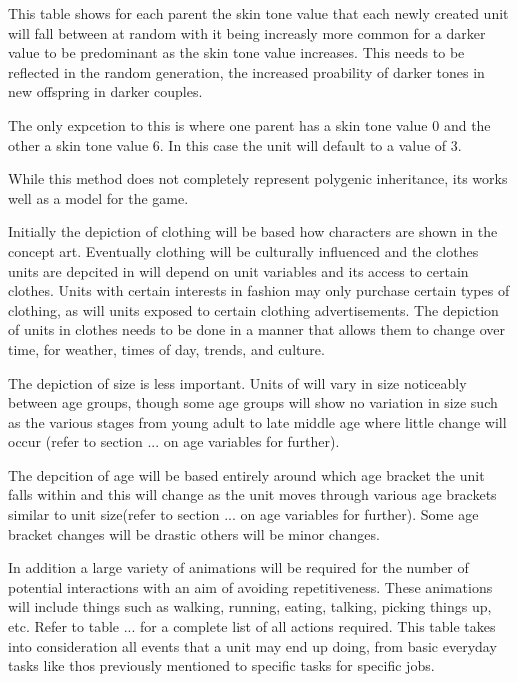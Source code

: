 This table shows for each parent the skin tone value that each newly created unit will fall between at random with it being increasly more common for a darker value to be predominant as the skin tone value increases. This needs to be reflected in the random generation, the increased proability of darker tones in new offspring in darker couples.

The only expcetion to this is where one parent has a skin tone value 0 and the other a skin tone value 6. In this case the unit will default to a value of 3.

While this method does not completely represent polygenic inheritance, its works well as a model for the game.  


Initially the depiction of clothing will be based how characters are shown in the concept art. Eventually clothing will be culturally influenced and the clothes units are depcited in will depend on unit variables and its access to certain clothes. Units with certain interests in fashion may only purchase certain types of clothing, as will units exposed to certain clothing advertisements. The depiction of units in clothes needs to be done in a manner that allows them to change over time, for weather, times of day, trends, and culture.  

The depiction of size is less important. Units of will vary in size noticeably between age groups, though some age groups will show no variation in size such as the various stages from young adult to late middle age where little change will occur (refer to section ... on age variables for further). 

The depcition of age will be based entirely around which age bracket the unit falls within and this will change as the unit moves through various age brackets similar to unit size(refer to section ... on age variables for further). Some age bracket changes will be drastic others will be minor changes.

In addition a large variety of animations will be required for the number of potential interactions with an aim of avoiding repetitiveness. These animations will include things such as walking, running, eating, talking, picking things up, etc. Refer to table ... for a complete list of all actions required. This table takes into consideration all events that a unit may end up doing, from basic everyday tasks like thos previously mentioned to specific tasks for specific jobs. 

